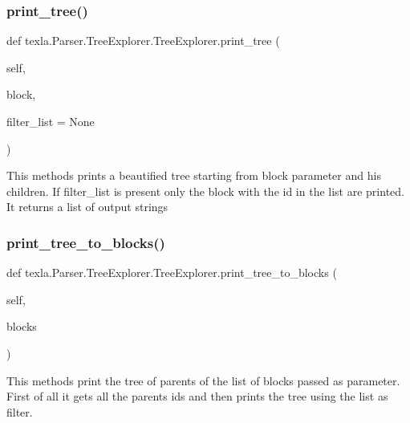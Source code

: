 \subsubsection{\texorpdfstring{print\+\_\+tree()}{print\_tree()}}
{\footnotesize\ttfamily def texla.\+Parser.\+Tree\+Explorer.\+Tree\+Explorer.\+print\+\_\+tree (\begin{DoxyParamCaption}\item[{}]{self,  }\item[{}]{block,  }\item[{}]{filter\+\_\+list = {\ttfamily None} }\end{DoxyParamCaption})}

\begin{DoxyVerb}This methods prints a beautified tree starting
from block parameter and his children. If filter_list
is present only the block with the id in the list
are printed. It returns a list of output strings\end{DoxyVerb}
 \hypertarget{classtexla_1_1Parser_1_1TreeExplorer_1_1TreeExplorer_a958b21268709209a935f718b6a7b8c3d}{}\label{classtexla_1_1Parser_1_1TreeExplorer_1_1TreeExplorer_a958b21268709209a935f718b6a7b8c3d} 
\subsubsection{\texorpdfstring{print\+\_\+tree\+\_\+to\+\_\+blocks()}{print\_tree\_to\_blocks()}}
{\footnotesize\ttfamily def texla.\+Parser.\+Tree\+Explorer.\+Tree\+Explorer.\+print\+\_\+tree\+\_\+to\+\_\+blocks (\begin{DoxyParamCaption}\item[{}]{self,  }\item[{}]{blocks }\end{DoxyParamCaption})}

\begin{DoxyVerb}This methods print the tree of parents
of the list of blocks passed as parameter.
First of all it gets all the parents ids and
then prints the tree using the list as filter.\end{DoxyVerb}
 \hypertarget{classtexla_1_1Parser_1_1TreeExplorer_1_1TreeExplorer_a07c509d8c1ce6695e1e343b722b19dbe}{}\label{classtexla_1_1Parser_1_1TreeExplorer_1_1TreeExplorer_a07c509d8c1ce6695e1e343b722b19dbe} 
